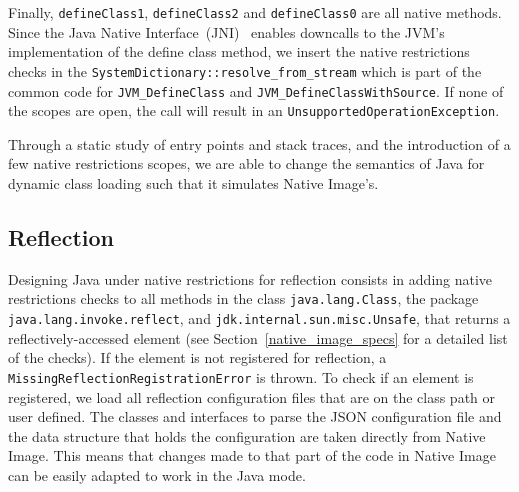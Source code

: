 Finally, \verb|defineClass1|, \verb|defineClass2| and \verb|defineClass0| are all native methods. Since the Java Native Interface~(JNI)~\cite{noauthor_jni_nodate} enables downcalls to the JVM's implementation of the define class method, we insert the native restrictions checks in the \verb|SystemDictionary::resolve_from_stream| which is part of the common code for \verb|JVM_DefineClass| and \verb|JVM_DefineClassWithSource|. If none of the scopes are open, the call will result in an \verb|UnsupportedOperationException|. 

Through a static study of entry points and stack traces, and the introduction of a few native restrictions scopes, we are able to change the semantics of Java for dynamic class loading such that it simulates Native Image's.
\subsection{Reflection}
Designing Java under native restrictions for reflection consists in adding native restrictions checks to all methods in the class \verb|java.lang.Class|, the package \verb|java.lang.invoke.reflect|, and \verb|jdk.internal.sun.misc.Unsafe|, that returns a reflectively-accessed element (see Section~\ref{native_image_specs} for a detailed list of the checks). 
If the element is not registered for reflection, a \verb|MissingReflectionRegistrationError| is thrown.
To check if an element is registered, we load all reflection configuration files that are on the class path or user defined. The classes and interfaces to parse the JSON configuration file and the data structure that holds the configuration are taken directly from Native Image. This means that changes made to that part of the code in Native Image can be easily adapted to work in the Java mode.

